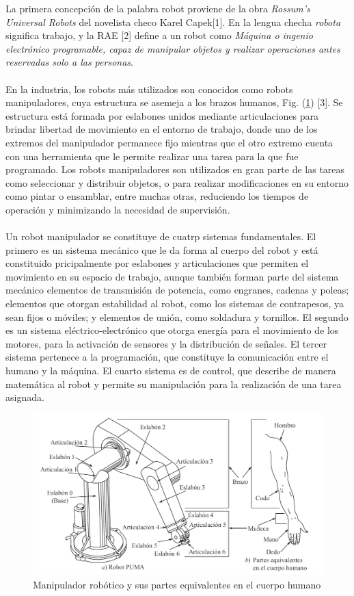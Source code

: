 \textcolor{Azul}La primera concepción de la palabra robot proviene de la obra \textit{Rossum's Universal Robots} del novelista checo Karel Capek[1]. En la lengua checha \textit{robota} significa trabajo, y la RAE [2] define a un robot como \textit{Máquina o ingenio electrónico programable, capaz de manipular objetos y realizar operaciones antes reservadas solo a las personas}. \\\\En la industria, los robots  más utilizados son conocidos como robots manipuladores, cuya estructura se asemeja a los brazos humanos, Fig. (\ref{estructurarobot}) [3]. Se estructura está formada por eslabones unidos mediante articulaciones para brindar libertad de movimiento en el entorno de trabajo, donde uno de los extremos del manipulador permanece fijo mientras que el otro extremo cuenta con una herramienta que le permite realizar una tarea para la que fue programado. Los robots manipuladores son utilizados en gran parte de las tareas como seleccionar y distribuir objetos, o para realizar modificaciones en su entorno como pintar o ensamblar, entre muchas otras, reduciendo los tiempos de operación y minimizando la necesidad de supervisión.\\\\Un robot manipulador se constituye de cuatrp sistemas fundamentales. El primero es un sistema mecánico que le da forma al cuerpo del robot y está constituido pricipalmente por eslabones y articulaciones que permiten el movimiento en su espacio de trabajo, aunque también forman parte del sistema mecánico elementos de transmisión de potencia, como engranes, cadenas y poleas; elementos que otorgan estabilidad al robot, como los sistemas de contrapesos, ya sean fijos o móviles; y elementos de unión, como soldadura y tornillos. El segundo es un sistema eléctrico-electrónico que otorga energía para el movimiento de los motores, para la activación de sensores y la distribución de señales. El tercer sistema pertenece a la programación, que constituye la comunicación entre el humano y la máquina. El cuarto  sistema es de control, que describe de manera matemática al robot y permite su manipulación para la realización de una tarea asignada.

\begin{figure}
	\centering
	\includegraphics[scale=0.5]{Capitulo1/figs/EstructuraManipulador.png} 
	\caption{Manipulador robótico y sus partes equivalentes en el cuerpo humano}
	\label{estructurarobot}
\end{figure}




